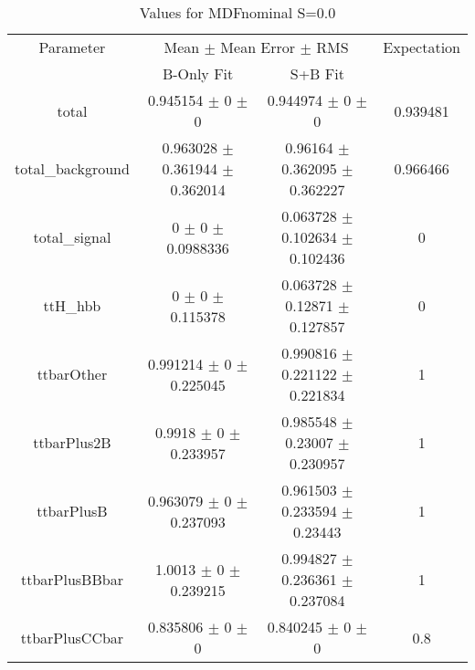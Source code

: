 \begin{table}
\centering
\caption{Values for MDFnominal S=0.0}
\begin{tabular}{cccc}
\toprule
Parameter & \multicolumn{2}{c}{Mean $\pm$ Mean Error $\pm$ RMS} & Expectation\\
 & B-Only Fit & S+B Fit & \\
\midrule
total & \num{0.945154} $\pm$ \num{0} $\pm$ \num{0} & \num{0.944974} $\pm$ \num{0} $\pm$ \num{0} & \num{0.939481}\\
total\_background & \num{0.963028} $\pm$ \num{0.361944} $\pm$ \num{0.362014} & \num{0.96164} $\pm$ \num{0.362095} $\pm$ \num{0.362227} & \num{0.966466}\\
total\_signal & \num{0} $\pm$ \num{0} $\pm$ \num{0.0988336} & \num{0.063728} $\pm$ \num{0.102634} $\pm$ \num{0.102436} & \num{0}\\
ttH\_hbb & \num{0} $\pm$ \num{0} $\pm$ \num{0.115378} & \num{0.063728} $\pm$ \num{0.12871} $\pm$ \num{0.127857} & \num{0}\\
ttbarOther & \num{0.991214} $\pm$ \num{0} $\pm$ \num{0.225045} & \num{0.990816} $\pm$ \num{0.221122} $\pm$ \num{0.221834} & \num{1}\\
ttbarPlus2B & \num{0.9918} $\pm$ \num{0} $\pm$ \num{0.233957} & \num{0.985548} $\pm$ \num{0.23007} $\pm$ \num{0.230957} & \num{1}\\
ttbarPlusB & \num{0.963079} $\pm$ \num{0} $\pm$ \num{0.237093} & \num{0.961503} $\pm$ \num{0.233594} $\pm$ \num{0.23443} & \num{1}\\
ttbarPlusBBbar & \num{1.0013} $\pm$ \num{0} $\pm$ \num{0.239215} & \num{0.994827} $\pm$ \num{0.236361} $\pm$ \num{0.237084} & \num{1}\\
ttbarPlusCCbar & \num{0.835806} $\pm$ \num{0} $\pm$ \num{0} & \num{0.840245} $\pm$ \num{0} $\pm$ \num{0} & \num{0.8}\\
\bottomrule
\end{tabular}
\end{table}